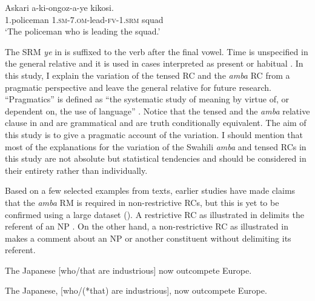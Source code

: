 \documentclass[output=paper,colorlinks,citecolor=brown]{langscibook}
\begin{document}
\ea%
    \label{ex:mwamzandi:3}
    \gll    Askari a-ki-ongoz-a-ye kikosi.\\
            1.policeman  \textsc{1.sm-7.om-}lead\textsc{-fv-1.srm}  squad\\
    \glt    ‘The policeman who is leading the squad.’
\z

The SRM \textit{ye} in  is suffixed to the verb after the final vowel. Time is unspecified in the general relative and it is used in cases interpreted as present or habitual \citep{Ashton1944}. In this study, I explain the variation of the tensed RC and the \textit{amba} RC from a pragmatic perspective and leave the general relative for future research. “Pragmatics” is defined as “the systematic study of meaning by virtue of, or dependent on, the use of language” \citep[2]{Huang2007}. Notice that the tensed and the \textit{amba} relative clause in  and  are grammatical and are truth conditionally equivalent. The aim of this study is to give a pragmatic account of the variation. I should mention that most of the explanations for the variation of the Swahili \textit{amba} and tensed RCs in this study are not absolute but statistical tendencies and should be considered in their entirety rather than individually.

Based on a few selected examples from texts, earlier studies have made claims that the \textit{amba} RM is required in non-restrictive RCs, but this is yet to be confirmed using a large dataset (\citealt{Ashton1944, Schadeberg1989}). A restrictive RC as illustrated in  delimits the referent of an NP \citep[206]{Andrews2007}. On the other hand, a non-restrictive RC as illustrated in  makes a comment about an NP or another constituent without delimiting its referent. 

\ea%
    \label{ex:mwamzandi:4}
    The Japanese [who/that are industrious] now outcompete Europe.
\z

\ea%
    \label{ex:mwamzandi:5}
    The Japanese, [who/(*that) are industrious], now outcompete Europe. \hfill \citep[168]{Keenan1985}
\z
\end{document}
